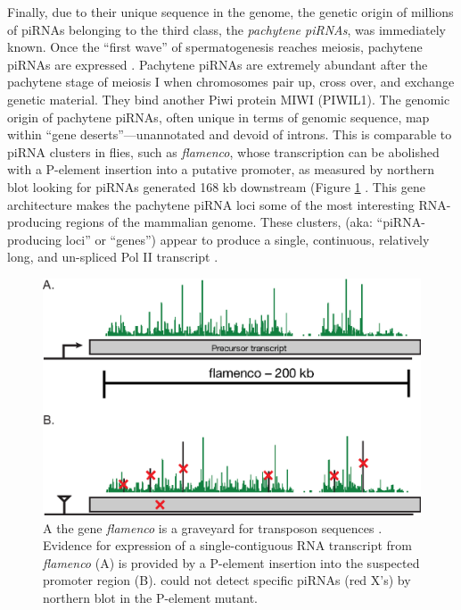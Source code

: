 {    Finally, due to their unique sequence in the genome, the genetic origin of millions of piRNAs belonging to the third class, the \textit{pachytene piRNAs}, was immediately known. Once the ``first wave'' of spermatogenesis \citep{Oakberg1956b, Laiho2013a} reaches meiosis, pachytene piRNAs are expressed \citep{Girard2006, Lau2006, Li2013h}. Pachytene piRNAs are extremely abundant after the pachytene stage of meiosis I when chromosomes pair up, cross over, and exchange genetic material. They bind another Piwi protein MIWI (PIWIL1). The genomic origin of pachytene piRNAs, often unique in terms of genomic sequence, map within ``gene deserts''---unannotated and devoid of introns. This is comparable to piRNA clusters in flies, such as \textit{flamenco}, whose transcription can be abolished with a P-element insertion into a putative promoter, as measured by northern blot looking for piRNAs generated 168 kb downstream (Figure \ref{Intro:fig:flamenco} \citep{Brennecke2007,Goriaux2014}. This gene architecture makes the pachytene piRNA loci some of the most interesting RNA-producing regions of the mammalian genome. These clusters, (aka: ``piRNA-producing loci'' or ``genes'') appear to produce a single, continuous, relatively long, and un-spliced Pol II transcript \citep{Li2013h}. 

    \begin{figure} %
      \centering 
      \includegraphics{Figures/Intro/FlamencoLocus.eps}
      \caption[Genetic evidence for long, continuous fly piRNA precursor transcripts]
      {
        A the \flies{} gene \textit{flamenco} is a graveyard for transposon sequences \citep{Pelisson1994}. Evidence for expression of a single-contiguous RNA transcript from \textit{flamenco} (A) is provided by a P-element insertion into the suspected promoter region (B). \citep{Brennecke2007} could not detect specific piRNAs (red X's) by northern blot in the P-element mutant.
        }
      \label{Intro:fig:flamenco}
      \end{figure}

}
